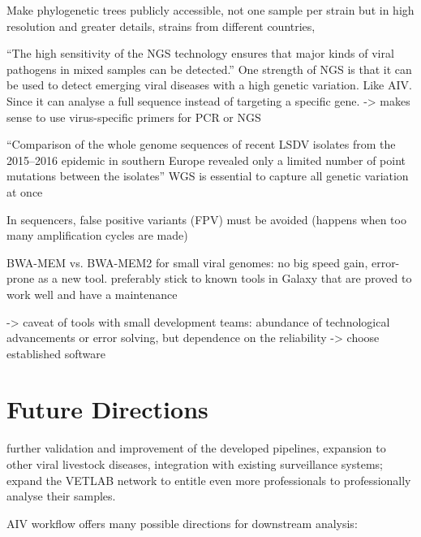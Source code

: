 Make phylogenetic trees publicly accessible, not one sample per strain but in high resolution and greater details, strains from different countries,

``The high sensitivity of the \ac{NGS} technology ensures that major kinds of viral pathogens in mixed samples can be detected.''
One strength of \ac{NGS} is that it can be used to detect emerging viral diseases with a high genetic variation. Like \ac{AIV}. Since it can analyse a full sequence instead of targeting a specific gene. -> makes sense to use virus-specific primers for \ac{PCR} or \ac{NGS} 

``Comparison of the whole genome sequences of recent \ac{LSDV} isolates from the 2015–2016 epidemic in southern Europe revealed only a limited number of point mutations between the isolates'' \ac{WGS} is essential to capture all genetic variation at once

In sequencers, false positive variants (\ac{FPV}) must be avoided (happens when too many amplification cycles are made)

BWA-MEM vs. BWA-MEM2 for small viral genomes: no big speed gain, error-prone as a new tool. preferably stick to known tools in Galaxy that are proved to work well and have a maintenance

-> caveat of tools with small development teams: abundance of technological advancements or error solving, but dependence on the reliability -> choose established software



\section{Future Directions}
\todoit
further validation and improvement of the developed pipelines, expansion to other viral livestock diseases, integration with existing surveillance systems; expand the \ac{VETLAB} network to entitle even more professionals to professionally analyse their samples.

\ac{AIV} workflow offers many possible directions for downstream analysis:

